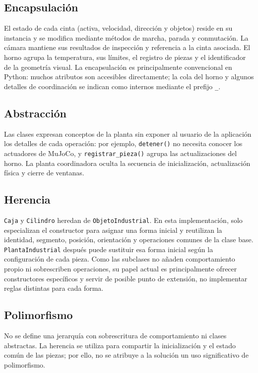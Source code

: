 \documentclass[12pt,a4paper]{article}
\begin{document}
\subsection{Encapsulación}

El estado de cada cinta (activa, velocidad, dirección y objetos) reside en su
instancia y se modifica mediante métodos de marcha, parada y conmutación. La
cámara mantiene sus resultados de inspección y referencia a la cinta asociada.
El horno agrupa la temperatura, sus límites, el registro de piezas y el
identificador de la geometría visual. La encapsulación es principalmente
convencional en Python: muchos atributos son accesibles directamente; la cola
del horno y algunos detalles de coordinación se indican como internos mediante
el prefijo \texttt{\_}.

\subsection{Abstracción}

Las clases expresan conceptos de la planta sin exponer al usuario de la
aplicación los detalles de cada operación: por ejemplo, \texttt{detener()} no
necesita conocer los actuadores de MuJoCo, y \texttt{registrar\_pieza()} agrupa
las actualizaciones del horno. La planta coordinadora oculta la secuencia de
inicialización, actualización física y cierre de ventanas.

\subsection{Herencia}

\texttt{Caja} y \texttt{Cilindro} heredan de \texttt{ObjetoIndustrial}. En esta
implementación, solo especializan el constructor para asignar una forma inicial
y reutilizan la identidad, segmento, posición, orientación y operaciones
comunes de la clase base. \texttt{PlantaIndustrial} después puede sustituir esa
forma inicial según la configuración de cada pieza. Como las subclases no
añaden comportamiento propio ni sobrescriben operaciones, su papel actual es
principalmente ofrecer constructores específicos y servir de posible punto de
extensión, no implementar reglas distintas para cada forma.

\subsection{Polimorfismo}

No se define una jerarquía con sobrescritura de comportamiento ni clases
abstractas. La herencia se utiliza para compartir la inicialización y el estado
común de las piezas; por ello, no se atribuye a la solución un uso significativo
de polimorfismo.
\end{document}
